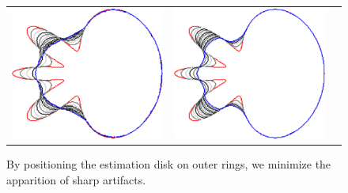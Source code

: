 \begin{figure}
\begin{tabular}{ccc}
\includegraphics[scale=0.22]{figures/chapter6/level-effect/flower/improve/len_pen0/radius-5/level4/summary.pdf} &
\includegraphics[scale=0.22]{figures/chapter6/level-effect/flower/improve/len_pen0/radius-5/level5/summary.pdf} 
\end{tabular}
\caption{ By positioning the estimation disk on outer rings, we minimize the apparition of sharp artifacts. %
}
\label{ch6:fig:mrings-r5-evolution}
\end{figure}


